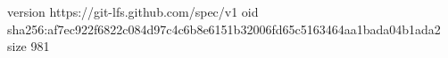 version https://git-lfs.github.com/spec/v1
oid sha256:af7ec922f6822c084d97c4c6b8e6151b32006fd65c5163464aa1bada04b1ada2
size 981
